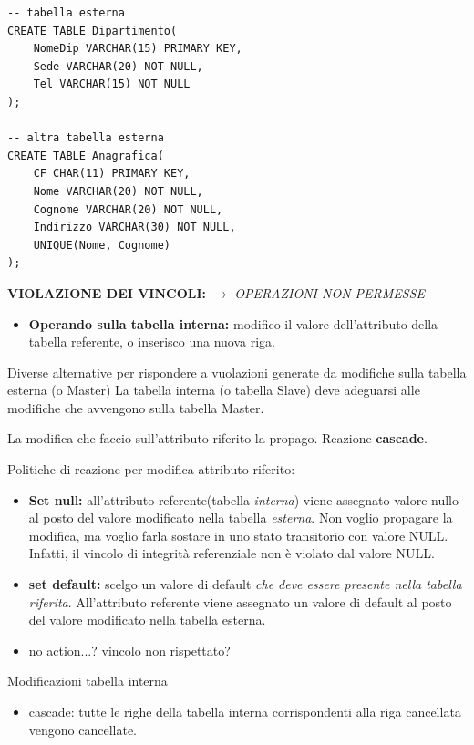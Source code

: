 \documentclass{article}
\begin{document}
\begin{itemize}
\begin{lstlisting}[style=sqlstyle]
-- tabella esterna
CREATE TABLE Dipartimento(
    NomeDip VARCHAR(15) PRIMARY KEY,
    Sede VARCHAR(20) NOT NULL,
    Tel VARCHAR(15) NOT NULL
);

-- altra tabella esterna
CREATE TABLE Anagrafica(
    CF CHAR(11) PRIMARY KEY,
    Nome VARCHAR(20) NOT NULL,
    Cognome VARCHAR(20) NOT NULL,
    Indirizzo VARCHAR(30) NOT NULL,
    UNIQUE(Nome, Cognome)
);
\end{lstlisting}

\textbf{VIOLAZIONE DEI VINCOLI:} $\to$ \textit{OPERAZIONI NON PERMESSE}

\begin{itemize}
\item \textbf{Operando sulla tabella interna:} modifico il valore dell'attributo della tabella referente, o inserisco una nuova riga.
\end{itemize}

Diverse alternative per rispondere a vuolazioni generate da modifiche sulla tabella esterna (o Master)
La tabella interna (o tabella Slave) deve adeguarsi alle modifiche che avvengono sulla tabella Master.

La modifica che faccio sull'attributo riferito la propago. Reazione \textbf{cascade}.

Politiche di reazione per modifica attributo riferito:\begin{itemize}
	\item \textbf{Set null:} all'attributo referente(tabella \textit{interna}) viene assegnato valore nullo al posto del valore modificato nella tabella \textit{esterna}. Non voglio propagare la modifica, ma voglio farla sostare in uno stato transitorio con valore NULL. Infatti, il vincolo di integrità referenziale non è violato dal valore NULL. 
	\item \textbf{set default:} scelgo un valore di default \textit{che deve essere presente nella tabella riferita}. All'attributo referente viene assegnato un valore di default al posto del valore modificato nella tabella esterna. 
	\item no action...? vincolo non rispettato?  
\end{itemize}

Modificazioni tabella interna
\begin{itemize}
	
	\item cascade: tutte le righe della tabella interna corrispondenti alla riga cancellata vengono cancellate.
\end{itemize}


\end{itemize}
\end{document}
